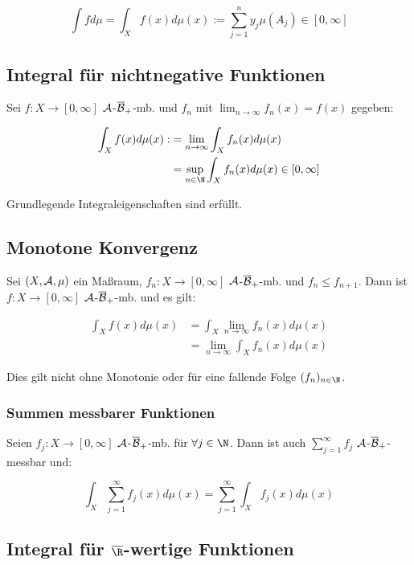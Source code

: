 $$\int f d\mu = \int_X f(x) d\mu(x) := \sum_{j=1}^n y_j \mu(A_j) \in [0, \infty]$$

\subsection*{Integral für nichtnegative Funktionen}

Sei $f : X \to [0, \infty]$ $\mathcal{A}$-$\overline{\mathcal{B}}_+$-mb. und $f_n$ mit $\lim_{n \to \infty} f_n(x) = f(x)$ gegeben:

\vspace{-4mm}
\begin{align*}
	\int_X f(x) d\mu(x) :&= \lim_{n \to \infty} \int_X f_n(x) d\mu(x) \\
	                &= \sup_{n \in \N} \int_X f_n(x) d\mu(x) \in [0,\infty]
\end{align*}

Grundlegende Integraleigenschaften sind erfüllt.

\subsection*{Monotone Konvergenz}

Sei $(X, \mathcal{A}, \mu)$ ein Maßraum, $f_n : X \to [0,\infty]$ $\mathcal{A}$-$\overline{\mathcal{B}}_+$-mb. und $f_n \leq f_{n+1}$. Dann ist $f : X \to [0,\infty]$ $\mathcal{A}$-$\overline{\mathcal{B}}_+$-mb. und es gilt:

\vspace{-4mm}
\begin{align*}
	\int_X f(x) d\mu(x) &= \int_X \lim_{n \to \infty} f_n(x) d\mu(x)\\
	               &= \lim_{n \to \infty} \int_X f_n(x) d\mu(x)
\end{align*}

Dies gilt nicht ohne Monotonie oder für eine fallende Folge $(f_n)_{n \in \N}$.

\subsubsection*{Summen messbarer Funktionen}

Seien $f_j : X \to [0,\infty]$ $\mathcal{A}$-$\overline{\mathcal{B}}_+$-mb. für $\forall j \in \N$. Dann ist auch $\sum_{j=1}^\infty f_j$ $\mathcal{A}$-$\overline{\mathcal{B}}_+$-messbar und:

$$\int_X \sum_{j=1}^\infty f_j(x) d\mu(x) = \sum_{j=1}^\infty \int_X f_j(x) d\mu(x)$$

\subsection*{Integral für $\overline\R$-wertige Funktionen}

